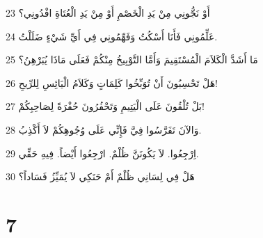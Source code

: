 \par 23 أَوْ نَجُّونِي مِنْ يَدِ الْخَصْمِ أَوْ مِنْ يَدِ الْعُتَاةِ افْدُونِي؟
\par 24 عَلِّمُونِي فَأَنَا أَسْكُتُ وَفَهِّمُونِي فِي أَيِّ شَيْءٍ ضَلَلْتُ.
\par 25 مَا أَشَدَّ الْكَلاَمَ الْمُسْتَقِيمَ وَأَمَّا التَّوْبِيخُ مِنْكُمْ فَعَلَى مَاذَا يُبَرْهِنُ؟
\par 26 هَلْ تَحْسِبُونَ أَنْ تُوَبِّخُوا كَلِمَاتٍ وَكَلاَمُ الْيَائِسِ لِلرِّيحِ!
\par 27 بَلْ تُلْقُونَ عَلَى الْيَتِيمِ وَتَحْفُرُونَ حُفْرَةً لِصَاحِبِكُمْ!
\par 28 وَالآنَ تَفَرَّسُوا فِيَّ فَإِنِّي عَلَى وُجُوهِكُمْ لاَ أَكْذِبُ.
\par 29 اِرْجِعُوا. لاَ يَكُونَنَّ ظُلْمٌ. ارْجِعُوا أَيْضاً. فِيهِ حَقِّي.
\par 30 هَلْ فِي لِسَانِي ظُلْمٌ أَمْ حَنَكِي لاَ يُمَيِّزُ فَسَاداً؟

\chapter{7}

